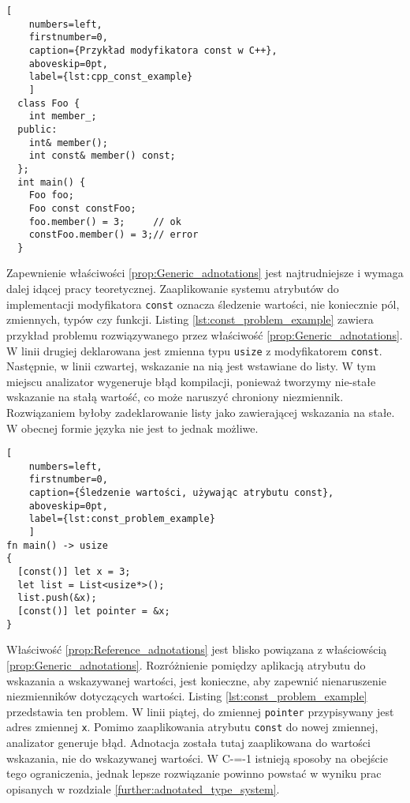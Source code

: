 \begin{minipage}{\linewidth}
  \begin{lstlisting}[
    numbers=left,
    firstnumber=0,
    caption={Przykład modyfikatora const w C++},
    aboveskip=0pt,
    label={lst:cpp_const_example}
    ]
  class Foo {
    int member_;
  public:
    int& member();
    int const& member() const;
  };
  int main() {
    Foo foo;
    Foo const constFoo;
    foo.member() = 3;     // ok
    constFoo.member() = 3;// error
  }
  \end{lstlisting}
\end{minipage}

Zapewnienie właściwości \ref{prop:Generic_adnotations} jest najtrudniejsze i wymaga dalej idącej pracy teoretycznej.
Zaaplikowanie systemu atrybutów do implementacji modyfikatora \lstinline{const} oznacza śledzenie wartości, nie koniecznie pól, zmiennych, typów czy funkcji.
Listing \ref{lst:const_problem_example} zawiera przykład problemu rozwiązywanego przez właściwość \ref{prop:Generic_adnotations}.
W linii drugiej deklarowana jest zmienna typu \lstinline{usize} z modyfikatorem \lstinline{const}.
Następnie, w linii czwartej, wskazanie na nią jest wstawiane do listy.
W tym miejscu analizator wygeneruje błąd kompilacji, ponieważ tworzymy nie-stałe wskazanie na stałą wartość, co może naruszyć chroniony niezmiennik.
Rozwiązaniem byłoby zadeklarowanie listy jako zawierającej wskazania na stałe.
W obecnej formie języka nie jest to jednak możliwe.

\begin{minipage}{\linewidth}
  
  \begin{lstlisting}[
    numbers=left,
    firstnumber=0,
    caption={Śledzenie wartości, używając atrybutu const},
    aboveskip=0pt,
    label={lst:const_problem_example}
    ]
fn main() -> usize
{
  [const()] let x = 3;
  let list = List<usize*>();
  list.push(&x);
  [const()] let pointer = &x;
}
\end{lstlisting}
\end{minipage}


Właściwość \ref{prop:Reference_adnotations} jest blisko powiązana z właściowścią \ref{prop:Generic_adnotations}.
Rozróżnienie pomiędzy aplikacją atrybutu do wskazania a wskazywanej wartości, jest konieczne, aby zapewnić nienaruszenie niezmienników dotyczących wartości.
Listing \ref{lst:const_problem_example} przedstawia ten problem.
W linii piątej, do zmiennej \lstinline{pointer} przypisywany jest adres zmiennej \lstinline{x}.
Pomimo zaaplikowania atrybutu \lstinline{const} do nowej zmiennej, analizator generuje błąd.
Adnotacja została tutaj zaaplikowana do wartości wskazania, nie do wskazywanej wartości.
W C-=-1 istnieją sposoby na obejście tego ograniczenia, jednak lepsze rozwiązanie powinno powstać w wyniku prac opisanych w rozdziale \ref{further:adnotated_type_system}.

